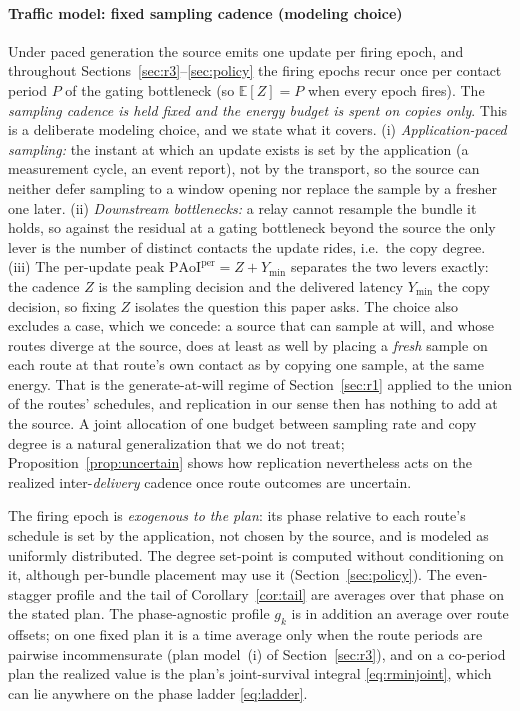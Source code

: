 \documentclass[twocolumn,3p,times,procedia]{elsarticle}
\theoremstyle{plain}
\theoremstyle{remark}
\newcommand{\PAoIper}{\mathrm{PAoI}^{\mathrm{per}}}
\newcommand{\E}{\mathbb{E}}
\newcommand{\Ymin}{Y_{\min}}
\begin{document}
\paragraph*{Traffic model: fixed sampling cadence (modeling choice)}
Under paced generation the source emits one update per firing epoch,
and throughout Sections~\ref{sec:r3}--\ref{sec:policy} the firing epochs
recur once per contact period $P$ of the gating bottleneck (so
$\E[Z]=P$ when every epoch fires). The \emph{sampling cadence is held
fixed and the energy budget is spent on copies only}. This is a
deliberate modeling choice, and we state what it covers. (i)
\emph{Application-paced sampling:} the instant at which an update
exists is set by the application (a measurement cycle, an event
report), not by the transport, so the source can neither defer
sampling to a window opening nor replace the sample by a fresher one
later. (ii)
\emph{Downstream bottlenecks:} a relay cannot resample the bundle it
holds, so against the residual at a gating bottleneck beyond the source
the only lever is the number of distinct contacts the update rides,
i.e.\ the copy degree. (iii) The per-update peak $\PAoIper=Z+\Ymin$
separates the two levers exactly: the cadence $Z$ is the sampling
decision and the delivered latency $\Ymin$ the copy decision, so fixing
$Z$ isolates the question this paper asks. The choice also excludes a
case, which we concede: a source that can sample at will, and whose
routes diverge at the source, does at least as well by placing a
\emph{fresh} sample on each route at that route's own contact as by
copying one sample, at the same energy. That is the generate-at-will
regime of Section~\ref{sec:r1} applied to the union of the routes'
schedules, and replication in our sense then has nothing to add at the
source. A joint allocation of one budget between sampling rate and copy
degree is a natural generalization that we do not treat;
Proposition~\ref{prop:uncertain} shows how replication nevertheless acts
on the realized inter-\emph{delivery} cadence once route outcomes are
uncertain.

The firing epoch is \emph{exogenous to the plan}: its phase relative to
each route's schedule is set by the application, not chosen by the
source, and is modeled as uniformly distributed. The degree set-point
is computed without conditioning on it, although per-bundle placement
may use it (Section~\ref{sec:policy}). The even-stagger profile and the
tail of Corollary~\ref{cor:tail} are averages over that phase on the
stated plan. The phase-agnostic profile $g_k$ is in addition an average
over route offsets; on one fixed plan it is a time average only when
the route periods are pairwise incommensurate (plan model~(i) of
Section~\ref{sec:r3}), and on a co-period plan the realized value is the
plan's joint-survival integral \eqref{eq:rminjoint}, which can lie
anywhere on the phase ladder \eqref{eq:ladder}.
\end{document}
